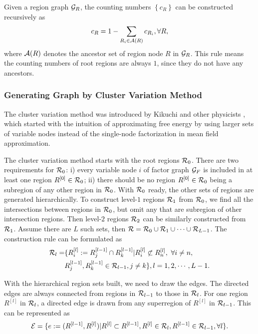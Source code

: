 Given a region graph $\mathcal{G}_R$, the counting numbers $\left\{ c_R \right\}$ can be constructed recursively as
\begin{equation}
  c_R = 1 - \sum_{R_i \in \mathcal{A}(R)} c_{R_i}, \forall R,
\end{equation}
where $\mathcal{A}(R)$ denotes the ancestor set of region node $R$ in $\mathcal{G}_R$. This rule means the counting numbers of root regions are always $1$, since they do not have any ancestors.


\subsubsection{Generating Graph by Cluster Variation Method}
\label{sec:cluster-variation-method}

The cluster variation method was introduced by Kikuchi and other physicists \cite{PhysRev.81.988,morita1991cluster}, which started with the intuition of approximating free energy by using larger sets of variable nodes instead of the single-node factorization in mean field approximation.

The cluster variation method starts with the root regions $\mathcal{R}_0$. There are two requirements for $\mathcal{R}_0$: i) every variable node $i$ of factor graph $\mathcal{G}_F$ is included in at least one region $R^{[0]}\in\mathcal{R}_0$; ii) there should be no region $R^{[0]}\in \mathcal{R}_0$ being a subregion of any other region in $\mathcal{R}_0$.
With $\mathcal{R}_0$ ready, the other sets of regions are generated hierarchically. To construct level-$1$ regions $\mathcal{R}_1$ from $\mathcal{R}_0$, we find all the intersections between regions in $\mathcal{R}_0$, but omit any that are subregion of other intersection regions. Then level-$2$ regions $\mathcal{R}_2$ can be similarly constructed from $\mathcal{R}_1$. Assume there are $L$ such sets, then $\mathcal{R} = \mathcal{R}_0 \cup \mathcal{R}_1 \cup \cdots \cup \mathcal{R}_{L-1}$. The construction rule can be formulated as
\begin{align}
  \mathcal{R}_l = &\{ R^{[l]}_i := R^{[l-1]}_j \cap R^{[l-1]}_k | R^{[l]}_i \not\subset R^{[l]}_n,~ \forall i \neq n, \nonumber \\
          &R^{[l-1]}_j, R^{[l-1]}_k \in \mathcal{R}_{l-1} , j\neq k\}, l=1, 2, \cdots, L-1.
\end{align}

With the hierarchical region sets built, we need to draw the edges. The directed edges are always connected from regions in $\mathcal{R}_{l-1}$ to those in $\mathcal{R}_{l}$. For one region $R^{[l]}$ in $\mathcal{R}_l$, a directed edge is drawn from any superregion of $R^{[l]}$ in $\mathcal{R}_{l-1}$. This can be represented as
\begin{align}
  \mathcal{E} = \{ e := (R^{[l-1]}, R^{[l]}) | R^{[l]} \subset R^{[l-1]}, R^{[l]} \in \mathcal{R}_l, R^{[l-1]} \in \mathcal{R}_{l-1} , \forall l\}.
\end{align}



